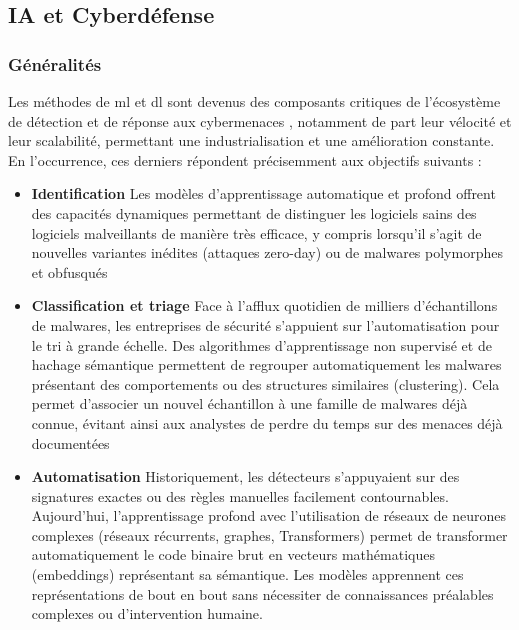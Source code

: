 \subsection{IA et Cyberdéfense}\label{sub:IA et Cyberdéfense} %

\subsubsection{Généralités}\label{sec:Généralités} %
Les méthodes de \gls{ml} et \gls{dl} sont devenus des composants critiques de l'écosystème de détection et de réponse aux cybermenaces \cite{nnaka_ai_threat_detection_2025}, notamment de part leur vélocité et leur scalabilité, permettant une industrialisation et une amélioration constante. 
En l'occurrence, ces derniers répondent précisemment aux objectifs suivants :
\begin{itemize}
  \item \textbf{Identification} Les modèles d'apprentissage automatique et profond offrent des capacités dynamiques permettant de distinguer les logiciels sains des logiciels malveillants de manière très efficace, y compris lorsqu'il s'agit de nouvelles variantes inédites (attaques zero-day) ou de malwares polymorphes et obfusqués
  \item \textbf{Classification et triage} Face à l'afflux quotidien de milliers d'échantillons de malwares, les entreprises de sécurité s'appuient sur l'automatisation pour le tri à grande échelle. 
    Des algorithmes d'apprentissage non supervisé et de hachage sémantique permettent de regrouper automatiquement les malwares présentant des comportements ou des structures similaires (clustering). 
    Cela permet d'associer un nouvel échantillon à une famille de malwares déjà connue, évitant ainsi aux analystes de perdre du temps sur des menaces déjà documentées
  \item \textbf{Automatisation} Historiquement, les détecteurs s'appuyaient sur des signatures exactes ou des règles manuelles facilement contournables. 
    Aujourd'hui, l'apprentissage profond avec l'utilisation de réseaux de neurones complexes (réseaux récurrents, graphes, Transformers) permet de transformer automatiquement le code binaire brut en vecteurs mathématiques (embeddings) représentant sa sémantique. 
    Les modèles apprennent ces représentations de bout en bout sans nécessiter de connaissances préalables complexes ou d'intervention humaine.
\end{itemize}


